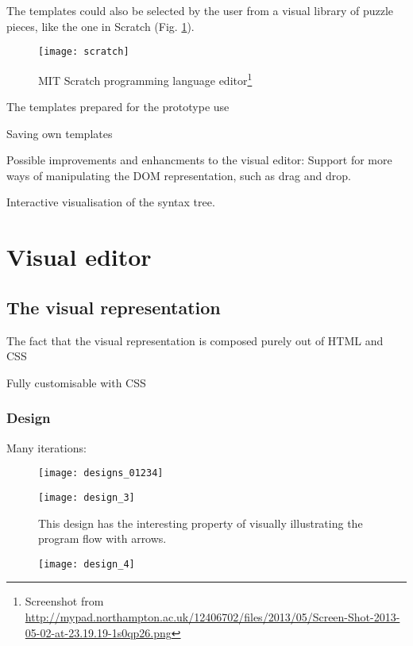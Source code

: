 The templates could also be selected by the user from a visual library of puzzle pieces, like the one in Scratch (Fig. \ref{fig:scratch}).
\begin{figure}[h!]
\centering
\texttt{[image: scratch]}
\caption{MIT Scratch programming language editor\footnote{Screenshot from  \url{
http://mypad.northampton.ac.uk/12406702/files/2013/05/Screen-Shot-2013-05-02-at-23.19.19-1s0qp26.png}}}
\label{fig:scratch}
\end{figure}

The templates prepared for the prototype use 

Saving own templates

Possible improvements and enhancments to the visual editor:
Support for more ways of manipulating the DOM representation, such as drag and drop.

Interactive visualisation of the syntax tree.


\section{Visual editor}
\subsection{The visual representation}
The fact that the visual representation is composed purely out of HTML and CSS 

Fully customisable with CSS

\subsubsection{Design}
Many iterations:

\begin{figure}[h!]
\centering
\texttt{[image: designs\_01234]}
\caption{}
\label{fig:designs_01234}
\end{figure}


\begin{figure}[h!]
\centering
\texttt{[image: design\_3]}
\caption{This design has the interesting property of visually illustrating the program flow with arrows.}
\label{fig:design_3}
\end{figure}


\begin{figure}[h!]
\centering
\texttt{[image: design\_4]}
\caption{}
\label{fig:design_4}
\end{figure}


